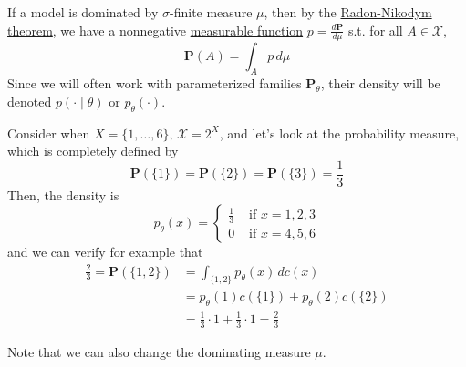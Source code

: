   If a model is dominated by $\sigma$-finite measure $\mu$, then by the \hyperref[mt-thm:rn-der]{Radon-Nikodym theorem}, we have a nonnegative \hyperref[mt-def:measurable-function]{measurable function} $p = \frac{d \mathbf{P}}{d \mu}$ s.t. for all $A \in \mathscr{X}$, 
  \begin{equation}
    \mathbf{P}(A) = \int_A p \, d\mu
  \end{equation}
  Since we will often work with parameterized families $\mathbf{P}_\theta$, their density will be denoted $p(\cdot \mid \theta)$ or $p_\theta (\cdot)$.  

  \begin{example}
    \label{ex:discrete-models}
    Consider when $X = \{1, \ldots, 6\}$, $\mathscr{X} = 2^X$, and let's look at the probability measure, which is completely defined by 
    \begin{equation}
      \mathbf{P}(\{1\}) = \mathbf{P}(\{2\}) = \mathbf{P}(\{3\}) = \frac{1}{3}
    \end{equation}
    Then, the density is 
    \begin{equation}
      p_\theta (x) = \begin{cases} 
        \frac{1}{3} & \text{ if } x = 1, 2, 3 \\ 
        0 & \text{ if }x = 4, 5, 6
      \end{cases} 
    \end{equation}
    and we can verify for example that 
    \begin{align}
      \frac{2}{3} = \mathbf{P}(\{1, 2\}) & = \int_{\{1, 2\}} p_\theta (x) \, d c(x) \\ 
                                         & = p_\theta (1) c(\{1\}) + p_\theta (2) c(\{2\}) \\ 
                                         & = \frac{1}{3} \cdot 1 + \frac{1}{3} \cdot 1 = \frac{2}{3}
    \end{align}
  \end{example}


  \begin{example}
    \label{ex:absolutely-continuous-models}
 

  \end{example}

  Note that we can also change the dominating measure $\mu$. 

